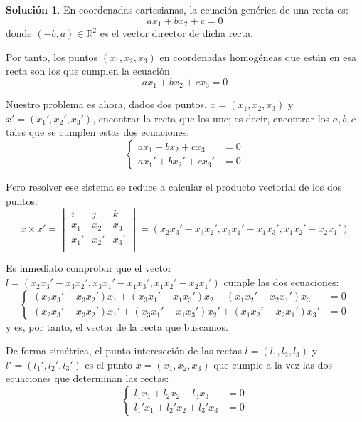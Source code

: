 \documentclass[a4paper, 11pt]{article}
\theoremstyle{definition}
\newtheorem*{solucion}{Solución}
\theoremstyle{theorem}
\begin{document}
  \begin{solucion}
      En coordenadas cartesianas, la ecuación genérica de una recta es:
      \[
      ax_1 + bx_2 + c = 0
      \]
      donde $(-b,a)\in\mathbb{R}^2$ es el vector director de dicha recta.

      Por tanto, los puntos $(x_1,x_2,x_3)$ en coordenadas homogéneas que están en esa recta son los que cumplen la ecuación
      \[
      ax_1 + bx_2 + cx_3 = 0
      \]

      Nuestro problema es ahora, dados dos puntos, $x=(x_1,x_2,x_3)$ y $x'=(x_1',x_2',x_3')$, encontrar la recta que los une; es decir, encontrar los $a,b,c$ tales que se cumplen estas dos ecuaciones:
      \[
      \begin{cases}
          ax_1 + bx_2 + cx_3 &= 0 \\
          ax_1' + bx_2' + cx_3' &= 0
      \end{cases}
      \]

      Pero resolver ese sistema se reduce a calcular el producto vectorial de los dos puntos:
      \[
      x \times x' =
      \begin{vmatrix}
          i & j & k \\
          x_1 & x_2 & x_3 \\
          x_1' & x_2' & x_3' \\
      \end{vmatrix} =
      (x_2x_3'-x_3x_2', x_3x_1'-x_1x_3', x_1x_2'-x_2x_1')
      \]

      Es inmediato comprobar que el vector $l = (x_2x_3'-x_3x_2', x_3x_1'-x_1x_3', x_1x_2'-x_2x_1')$ cumple las dos ecuaciones:
      \[
      \begin{cases}
          (x_2x_3'-x_3x_2')x_1 + (x_3x_1'-x_1x_3')x_2 + (x_1x_2'-x_2x_1')x_3 &= 0 \\
          (x_2x_3'-x_3x_2')x_1' + (x_3x_1'-x_1x_3')x_2' + (x_1x_2'-x_2x_1')x_3' &= 0
      \end{cases}
      \]
      y es, por tanto, el vector de la recta que buscamos.

      De forma simétrica, el punto interescción de las rectas $l=(l_1,l_2,l_3)$ y $l'=(l_1',l_2',l_3')$ es el punto $x=(x_1,x_2,x_3)$ que cumple a la vez las dos ecuaciones que determinan las rectas:
      \[
      \begin{cases}
          l_1x_1 + l_2x_2 + l_3x_3 &= 0 \\
          l_1'x_1 + l_2'x_2 + l_3'x_3 &= 0
      \end{cases}
      \]


\end{solucion}
\end{document}
